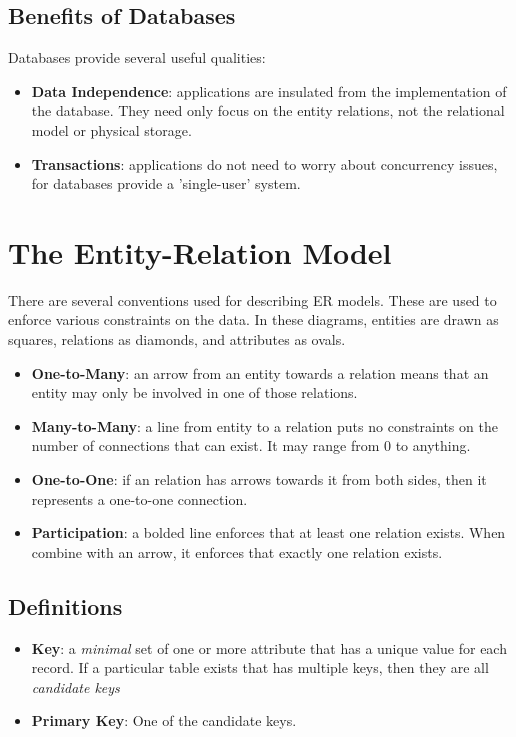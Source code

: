 \documentclass{article}
\begin{document}
\subsection{Benefits of Databases}

Databases provide several useful qualities:
\begin{itemize}
\item \textbf{Data Independence}: applications are insulated from the implementation of the database. They need only focus on the entity relations, not the relational model or physical storage.
\item \textbf{Transactions}: applications do not need to worry about concurrency issues, for databases provide a 'single-user' system.
\end{itemize}
\pagebreak
\section{The Entity-Relation Model}

There are several conventions used for describing ER models. These are used to enforce various constraints on the data. In these diagrams, entities are drawn as squares, relations as diamonds, and attributes as ovals.
\begin{itemize}
\item \textbf{One-to-Many}: an arrow from an entity towards a relation means that an entity may only be involved in one of those relations.
\item \textbf{Many-to-Many}: a line from entity to a relation puts no constraints on the number of connections that can exist. It may range from 0 to anything.
\item \textbf{One-to-One}: if an relation has arrows towards it from both sides, then it represents a one-to-one connection.
\item \textbf{Participation}: a bolded line enforces that at least one relation exists. When combine with an arrow, it enforces that exactly one relation exists.
\end{itemize}

\subsection{Definitions}
\begin{itemize}
\item \textbf{Key}: a \textit{minimal} set of one or more attribute that has a unique value for each record. If a particular table exists that has multiple keys, then they are all \textit{candidate keys}
\item \textbf{Primary Key}: One of the candidate keys.
\end{itemize}
\end{document}
